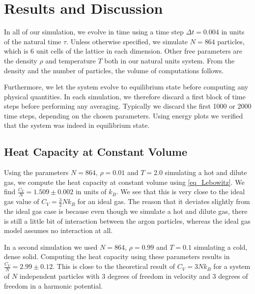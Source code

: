 \documentclass[twoside]{article}
\begin{document}

\section{Results and Discussion}
In all of our simulation, we evolve in time using a time step $\Delta t = 0.004$ in units of the natural time $\tau$. Unless otherwise specified, we simulate $N = 864$ particles, which is 6 unit cells of the lattice in each dimension. Other free parameters are the density $\rho$ and temperature $T$ both in our natural units system. From the density and the number of particles, the volume of computations follows.

Furthermore, we let the system evolve to equilibrium state before computing any physical quantities. In each simulation, we therefore discard a first block of time steps before performing any averaging. Typically we discard the first 1000 or 2000 time steps, depending on the chosen parameters. Using energy plots we verified that the system was indeed in equilibrium state.

\subsection{Heat Capacity at Constant Volume}
Using the parameters $N=864$, $\rho=0.01$ and $T=2.0$ simulating a hot and dilute gas, we compute the heat capacity at constant volume using \eqref{eq_Lebowitz}. We find $\frac{C_V}{N} = 1.509  \pm 0.002 $ in units of $k_B$. We see that this is very close to the ideal gas value of $C_V = \frac{3}{2} N k_B$ for an ideal gas. The reason that it deviates slightly from the ideal gas case is because even though we simulate a hot and dilute gas, there is still a little bit of interaction between the argon particles, whereas the ideal gas model assumes no interaction at all.

In a second simulation we used $N=864$, $\rho=0.99$ and $T=0.1$ simulating a cold, dense solid. Computing the heat capacity using these parameters results in $\frac{C_V}{N} = 2.99  \pm  0.12 $. This is close to the theoretical result of $C_V = 3 N k_B$ for a system of $N$ independent particles with 3 degrees of freedom in velocity and 3 degrees of freedom in a harmonic potential. 
\end{document}
